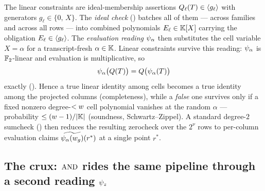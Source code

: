 The linear constraints are ideal-membership assertions
$Q_\ell(T)\in\langle g_\ell \rangle$ with generators $g_\ell\in\{0,\,X\}$. The
\emph{ideal check} () batches all of them --- across
families and across all rows --- into combined polynomials $E_\ell\in\mathbb{K}[X]$
carrying the obligation $E_\ell\in\langle g_\ell \rangle$. The \emph{evaluation reading}
$\psi_{\alpha}$ then substitutes the cell variable $X=\alpha$ for a transcript-fresh
$\alpha\in\mathbb{K}$. Linear constraints survive this reading: $\psi_{\alpha}$ is
$\mathbb{F}_2$-linear and evaluation is multiplicative, so
\[
  \psi_{\alpha}\bigl(Q(T)\bigr) = Q\bigl(\psi_{\alpha}(T)\bigr)
\]
exactly (). Hence a true linear identity among cells
becomes a true identity among the projected columns (completeness), while a
\emph{false} one survives only if a fixed nonzero degree-$<w$ cell
polynomial vanishes at the random $\alpha$ --- probability $\le(w-1)/|\mathbb{K}|$
(soundness, Schwartz--Zippel). A standard degree-$2$ sumcheck
() then reduces the resulting zerocheck over the $2^{\nu}$
rows to per-column evaluation claims $\widetilde{\psi_{\alpha}(w_g)}(r^*)$ at a single point
$r^*$.

\subsection{The crux: $\operatorname{AND}$ rides the same pipeline through a second reading $\psi_{z}$}
\label{sec:overview-crux}

